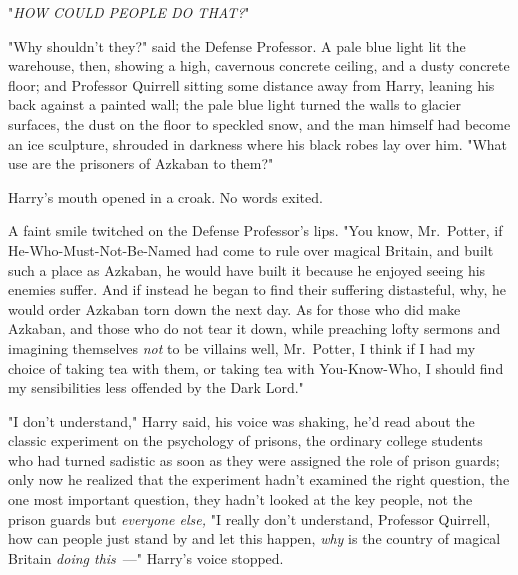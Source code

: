 "\emph{HOW COULD PEOPLE DO THAT?}"

"Why shouldn't they?" said the Defense Professor. A pale blue light lit the
warehouse, then, showing a high, cavernous concrete ceiling, and a dusty
concrete floor; and Professor Quirrell sitting some distance away from Harry,
leaning his back against a painted wall; the pale blue light turned the walls
to glacier surfaces, the dust on the floor to speckled snow, and the man
himself had become an ice sculpture, shrouded in darkness where his black robes
lay over him. "What use are the prisoners of Azkaban to them?"

Harry's mouth opened in a croak. No words exited.

A faint smile twitched on the Defense Professor's lips. "You know, Mr.~Potter,
if He-Who-Must-Not-Be-Named had come to rule over magical Britain, and built
such a place as Azkaban, he would have built it because he enjoyed seeing his
enemies suffer. And if instead he began to find their suffering distasteful,
why, he would order Azkaban torn down the next day. As for those who did make
Azkaban, and those who do not tear it down, while preaching lofty sermons and
imagining themselves \emph{not} to be villains{\el} well, Mr.~Potter, I
think if I had my choice of taking tea with them, or taking tea with
You-Know-Who, I should find my sensibilities less offended by the Dark Lord."

"I don't understand," Harry said, his voice was shaking, he'd read about the
classic experiment on the psychology of prisons, the ordinary college students
who had turned sadistic as soon as they were assigned the role of prison
guards; only now he realized that the experiment hadn't examined the right
question, the one most important question, they hadn't looked at the key
people, not the prison guards but \emph{everyone else,} "I really don't
understand, Professor Quirrell, how can people just stand by and let this
happen, \emph{why} is the country of magical Britain \emph{doing this}~---"
Harry's voice stopped.

